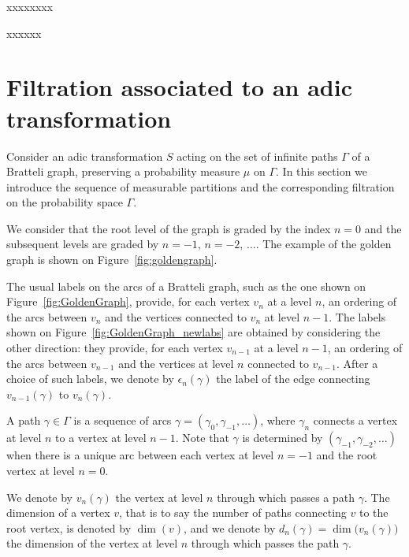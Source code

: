 \documentclass[12pt,a4paper]{article}
\begin{document}
xxxxxxxx

xxxxxx

\section{Filtration associated to an adic transformation} 

Consider an adic transformation $S$ acting on the set of infinite paths $\Gamma$ of a 
Bratteli graph, preserving a probability measure $\mu$ on $\Gamma$. 
In this section we introduce the sequence of measurable partitions 
and the corresponding filtration on the probability space $\Gamma$.

We consider that the root level of the graph is graded by the index 
$n=0$ and the subsequent levels are graded by $n=-1$, $n=-2$, $\ldots$. 
The example of the golden graph is shown on Figure~\ref{fig:goldengraph}. 

The usual labels on the arcs of a Bratteli graph, such as the one 
shown on Figure~\ref{fig:GoldenGraph}, provide, for each vertex $v_n$ 
at a level $n$, an ordering of the arcs between $v_n$ and the vertices connected 
to $v_n$ at level $n-1$.  
The labels shown on Figure~\ref{fig:GoldenGraph_newlabs}  
are obtained by considering the other direction: they provide, 
for each vertex $v_{n-1}$ at a level $n-1$, 
an ordering of the arcs between $v_{n-1}$ and the vertices at level $n$ connected 
to $v_{n-1}$. 
After a choice of such labels, we denote 
by $\boxed{\epsilon_n(\gamma)}$ the label of the edge connecting $v_{n-1}(\gamma)$ to 
$v_n(\gamma)$. 



A path $\gamma \in \Gamma$ is a sequence of arcs 
$\gamma=(\gamma_0, \gamma_{-1}, \ldots)$, where $\gamma_n$ connects 
a vertex at level $n$ to a vertex at level $n-1$. 
Note that $\gamma$ is determined by $(\gamma_{-1}, \gamma_{-2}, \ldots)$ 
when there is a unique arc between each vertex at level $n=-1$ and the root vertex 
at level $n=0$.  

We denote by $v_n(\gamma)$ the vertex at level $n$ through which passes a path $\gamma$. 
The dimension of a vertex $v$, that is to say the number of paths connecting $v$ 
to the root vertex, is denoted by $\dim(v)$, and we denote by 
$\boxed{d_n(\gamma)=\dim\bigl(v_n(\gamma)\bigr)}$ the dimension of the vertex at level $n$ 
through which passes the path $\gamma$. 
\end{document}
